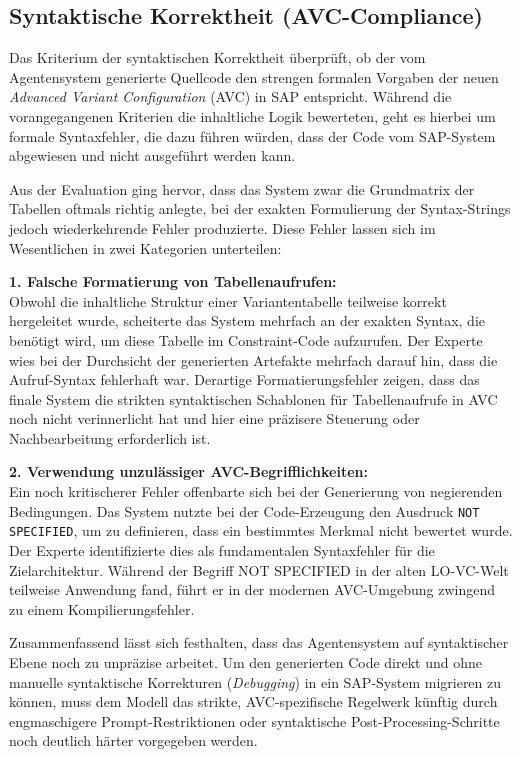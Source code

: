\subsection{Syntaktische Korrektheit (\ac{AVC}-Compliance)}
\label{subsubsec:eval_syntaktische_korrektheit}

Das Kriterium der syntaktischen Korrektheit überprüft, ob der vom Agentensystem generierte Quellcode den strengen formalen Vorgaben der neuen \textit{Advanced Variant Configuration} (\ac{AVC}) in SAP entspricht. Während die vorangegangenen Kriterien die inhaltliche Logik bewerteten, geht es hierbei um formale Syntaxfehler, die dazu führen würden, dass der Code vom SAP-System abgewiesen und nicht ausgeführt werden kann.

Aus der Evaluation ging hervor, dass das System zwar die Grundmatrix der Tabellen oftmals richtig anlegte, bei der exakten Formulierung der Syntax-Strings jedoch wiederkehrende Fehler produzierte. Diese Fehler lassen sich im Wesentlichen in zwei Kategorien unterteilen:

\textbf{1. Falsche Formatierung von Tabellenaufrufen:} \\
Obwohl die inhaltliche Struktur einer Variantentabelle teilweise korrekt hergeleitet wurde, scheiterte das System mehrfach an der exakten Syntax, die benötigt wird, um diese Tabelle im Constraint-Code aufzurufen. Der Experte wies bei der Durchsicht der generierten Artefakte mehrfach darauf hin, dass die Aufruf-Syntax fehlerhaft war. Derartige Formatierungsfehler zeigen, dass das finale System die strikten syntaktischen Schablonen für Tabellenaufrufe in \ac{AVC} noch nicht verinnerlicht hat und hier eine präzisere Steuerung oder Nachbearbeitung erforderlich ist.

\textbf{2. Verwendung unzulässiger \ac{AVC}-Begrifflichkeiten:} \\
Ein noch kritischerer Fehler offenbarte sich bei der Generierung von negierenden Bedingungen. Das System nutzte bei der Code-Erzeugung den Ausdruck \texttt{NOT SPECIFIED}, um zu definieren, dass ein bestimmtes Merkmal nicht bewertet wurde. Der Experte identifizierte dies als fundamentalen Syntaxfehler für die Zielarchitektur. Während der Begriff NOT SPECIFIED in der alten \ac{LO-VC}-Welt teilweise Anwendung fand, führt er in der modernen \ac{AVC}-Umgebung zwingend zu einem Kompilierungsfehler. 

Zusammenfassend lässt sich festhalten, dass das Agentensystem auf syntaktischer Ebene noch zu unpräzise arbeitet. Um den generierten Code direkt und ohne manuelle syntaktische Korrekturen (\textit{Debugging}) in ein SAP-System migrieren zu können, muss dem Modell das strikte, AVC-spezifische Regelwerk künftig durch engmaschigere Prompt-Restriktionen oder syntaktische Post-Processing-Schritte noch deutlich härter vorgegeben werden.

